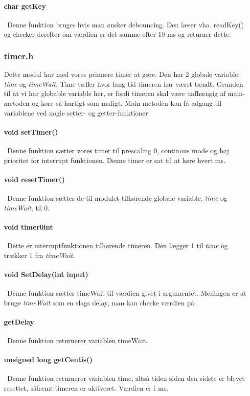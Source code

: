 \paragraph{char getKey}\
Denne funktion bruges hvis man ønsker debouncing. Den læser vha. readKey() og checker derefter om værdien er det samme efter 10 ms og returner dette.
\subsubsection{timer.h}
Dette modul har med vores primære timer at gøre. Den har 2 globale variable: \textit{time} og \textit{timeWait}. Time tæller hvor lang tid timeren har været tændt. Grunden til at vi har globable variable her, er fordi timeren skal være uafhængig af main-metoden og køre så hurtigt som muligt. Main-metoden kan få adgang til variablene ved nogle setter- og getter-funktioner
\paragraph{void setTimer()}\
Denne funktion sætter vores timer til prescaling 0, continous mode og høj prioritet for interrupt funktionen. Denne timer er sat til at køre hvert ms.
\paragraph{void resetTimer()}\
Denne funktion sætter de til modulet tilhørende globale variable, \textit{time} og \textit{timeWait}, til 0.
\paragraph{void timer0int}\
Dette er interruptfunktionen tilhørende timeren. Den lægger 1 til \textit{time} og trækker 1 fra \textit{timeWait}. 
\paragraph{void SetDelay(int input)}\
Denne funktion sætter timeWait til værdien givet i argumentet. Meningen er at bruge \textit{timeWait} som en slags delay, man kan checke værdien på
\paragraph{getDelay}\
Denne funktion returnerer variablen timeWait.
\paragraph{unsigned long getCentis()}\
Denne funktion returnerer variablen time, altså tiden siden den sidste er blevet resettet, såfremt timeren er aktiveret. Værdien er i ms.

